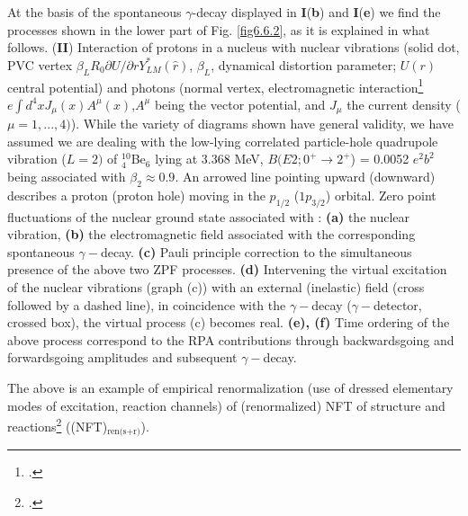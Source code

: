   	
  	At the basis of the spontaneous $\gamma$-decay displayed in \textbf{I}(\textbf{b}) and \textbf{I}(\textbf{e}) we find the processes shown in the lower part of Fig. \ref{fig6.6.2}, as it is explained in what follows. (\textbf{II}) Interaction of protons in a nucleus with nuclear vibrations (solid dot, PVC vertex 
  	$\beta_L R_0  \partial U/\partial r Y_{LM}^*(\hat r)$, $\beta_L$, dynamical
  	distortion parameter; $U(r)$ central potential) and photons (normal vertex, 
  	electromagnetic 
  	interaction\footnote{\cite{Holstein:89}.} $e \int d^4 x J_{\mu}(x) A^{\mu} (x)$,$A^{\mu}$ being 
  	the vector potential, and $J_{\mu}$ the current density ($\mu=1,...,4)$).
  	While the variety of diagrams shown have general validity, we have assumed
  	we are dealing with the low-lying correlated particle-hole quadrupole vibration 
  	($L=2)$ of $^{10}_4$Be$_6$ lying at 3.368 MeV,  $B(E2; 0^+ \to 2^+$) = 0.0052 $e^2 b^2$ being
  	associated with $\beta_2 \approx 0.9$. An arrowed line pointing  upward (downward) 
  	describes a proton (proton hole) moving in the $p_{1/2}$ ($1p_{3/2}$) orbital. 
  	Zero point fluctuations of the nuclear ground state associated with : {\bf (a)} the nuclear
  	vibration, {\bf (b)} the electromagnetic field associated with the corresponding spontaneous
  	$\gamma-$decay.   {\bf (c)} Pauli principle correction to the simultaneous presence 
  	of the above two ZPF processes. {\bf (d)} Intervening the virtual excitation of the nuclear vibrations 
  	(graph (c)) with an external (inelastic) field  (cross followed by a dashed line), in coincidence with the $\gamma-$decay 
  	($\gamma-$detector, crossed box), the virtual process (c) becomes real. {\bf (e), (f)}  Time ordering of the 
  	above process correspond to the  RPA contributions through backwardsgoing and forwardsgoing amplitudes
  	and subsequent $\gamma-$decay.
  	
  	
  	The above is an example of empirical renormalization (use of dressed elementary modes of excitation, reaction channels) of (renormalized) NFT of structure and reactions\footnote{\cite{Broglia:16}.} ((NFT)$_{\text{ren(s+r)}}$).
